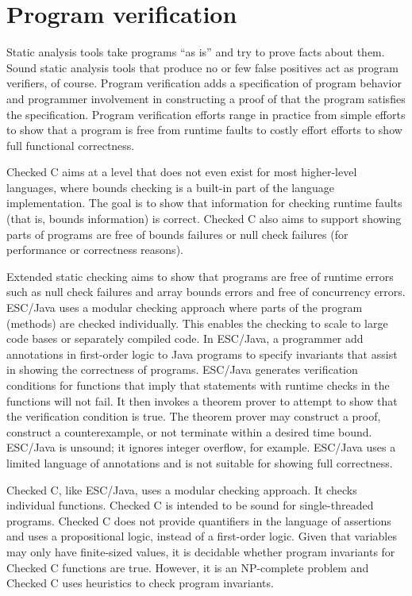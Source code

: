 \section{Program verification}

Static analysis tools take programs ``as is'' and try to prove
facts about them.  Sound static analysis tools that produce no or few false
positives act as program verifiers, of course.  Program verification 
adds a specification of program behavior and programmer involvement
in constructing a proof of that the program satisfies the specification.
Program verification efforts range in practice from simple efforts to
show that a program is free from runtime faults to costly effort 
efforts to show full functional correctness.

Checked C aims at a level that does not even exist for most higher-level
languages, where bounds checking is a built-in part of the language
implementation.  The goal is to show that information for checking runtime
faults (that is, bounds information) is correct. Checked C also aims to
support showing parts of programs are free of bounds failures or null
check failures (for performance or correctness reasons).

Extended static checking \cite{Flanagan2002} aims to show that programs are 
free of runtime errors such as null check failures and array bounds errors
and free of concurrency errors.  ESC/Java \cite{Flanagan2002}
uses a modular checking approach
where parts of the program (methods) are checked individually.  This enables 
the checking to scale to large code bases or separately compiled code.
In ESC/Java, a programmer add annotations in first-order logic to  Java programs to specify invariants 
that assist in showing the correctness of programs.  ESC/Java generates verification
conditions for functions that imply that statements with runtime checks in the
functions will not fail. It then invokes a theorem prover to attempt to 
show that the verification condition is true.  The theorem prover may construct
a proof, construct a counterexample, or not terminate within a desired time bound.
ESC/Java is unsound; it ignores integer overflow, for example.  ESC/Java uses 
a limited language of annotations and is not suitable for showing full correctness.

Checked C, like ESC/Java, uses a modular checking approach.  It checks 
individual functions.  Checked C is intended to be sound for single-threaded 
programs.  Checked C does not
provide quantifiers in the language of assertions and uses a propositional
logic, instead of a first-order logic. Given that variables may only have 
finite-sized values, it is decidable whether program invariants for Checked C 
functions are true.  However, it is an NP-complete problem and  Checked C uses
heuristics to check program invariants.

